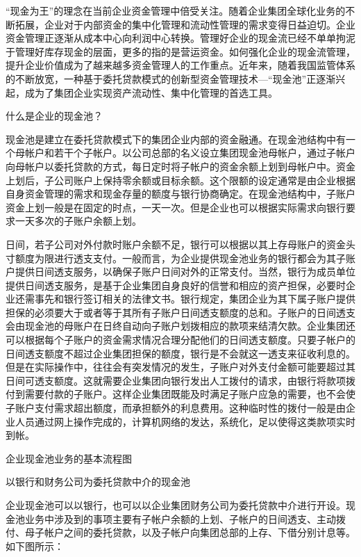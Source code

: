     “现金为王”的理念在当前企业资金管理中倍受关注。随着企业集团全球化业务的不断拓展，企业对于内部资金的集中化管理和流动性管理的需求变得日益迫切。企业资金管理正逐渐从成本中心向利润中心转换。管理好企业的现金流已经不单单拘泥于管理好库存现金的层面，更多的指的是营运资金。如何强化企业的现金流管理，提升企业价值成为了越来越多资金管理人的工作重点。近年来，随着我国监管体系的不断放宽，一种基于委托贷款模式的创新型资金管理技术—“现金池”正逐渐兴起，成为了集团企业实现资产流动性、集中化管理的首选工具。

    什么是企业的现金池？

    现金池是建立在委托贷款模式下的集团企业内部的资金融通。在现金池结构中有一个母帐户和若干个子帐户。以公司总部的名义设立集团现金池母帐户，通过子帐户向母帐户以委托贷款的方式，每日定时将子帐户的资金余额上划到母帐户中。资金上划后，子公司账户上保持零余额或目标余额。这个限额的设定通常是由企业根据自身资金管理的需求和现金存量的额度与银行协商确定。在现金池结构中，子账户资金上划一般是在固定的时点，一天一次。但是企业也可以根据实际需求向银行要求一天多次的子账户余额上划。

    日间，若子公司对外付款时账户余额不足，银行可以根据以其上存母账户的资金头寸额度为限进行透支支付。一般而言，为企业提供现金池业务的银行都会为其子账户提供日间透支服务，以确保子账户日间对外的正常支付。当然，银行为成员单位提供日间透支服务，是基于企业集团自身良好的信誉和相应的资产担保，必要时企业还需事先和银行签订相关的法律文书。银行规定，集团企业为其下属子账户提供担保的必须要大于或者等于其所有子账户日间透支额度的总和。子账户的日间透支会由现金池的母账户在日终自动向子账户划拨相应的款项来结清欠款。企业集团还可以根据每个子账户的资金需求情况合理分配他们的日间透支额度。只要子帐户的日间透支额度不超过企业集团担保的额度，银行是不会就这一透支来征收利息的。但是在实际操作中，往往会有突发情况的发生，子账户对外支付金额可能要超过其日间可透支额度。这就需要企业集团向银行发出人工拨付的请求，由银行将款项拨付到需要付款的子账户。这样企业集团既能及时满足子账户应急的需要，也不会使子账户支付需求超出额度，而承担额外的利息费用。这种临时性的拨付一般是由企业人员通过网上操作完成的，计算机网络的发达，系统化，足以使得这类款项实时到帐。

    企业现金池业务的基本流程图

    以银行和财务公司为委托贷款中介的现金池

    企业现金池可以以银行，也可以以企业集团财务公司为委托贷款中介进行开设。现金池业务中涉及到的事项主要有子帐户余额的上划、子帐户的日间透支、主动拨付、母子帐户之间的委托贷款，以及子帐户向集团总部的上存、下借分别计息等。如下图所示：
    　　

